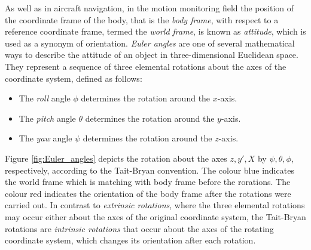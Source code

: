 As well as in aircraft navigation, in the motion monitoring field the position of the coordinate frame of the body, that is the \emph{body frame}, with respect to a reference coordinate frame, termed the \emph{world frame}, is known as \emph{attitude}, which is used as a synonym of orientation. \emph{Euler angles} are one of several mathematical ways to describe the attitude of an object in three-dimensional Euclidean space. They represent a sequence of three elemental rotations about the axes of the coordinate system, defined as follows:

\begin{itemize}
\item The \emph{roll} angle $\phi$ determines the rotation around the $x$-axis.
\item The \emph{pitch} angle $\theta$ determines the rotation around the $y$-axis.
\item The \emph{yaw} angle $\psi$ determines the rotation around the $z$-axis.
\end{itemize}

\noindent
Figure \ref{fig:Euler_angles} depicts the rotation about the axes $z, y', X$ by $\psi, \theta, \phi$, respectively, according to the Tait-Bryan convention. The colour blue indicates the world frame which is matching with body frame before the rorations. The colour red indicates the orientation of the body frame after the rotations were carried out. In contrast to \emph{extrinsic rotations}, where the three elemental rotations may occur either about the axes of the original coordinate system, the Tait-Bryan rotations are \emph{intrinsic rotations} that occur about the axes of the rotating coordinate system, which changes its orientation after each rotation.

